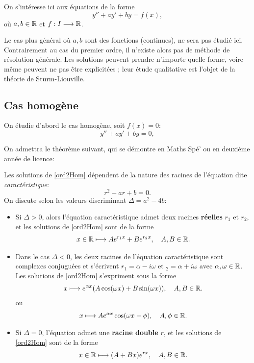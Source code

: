 \documentclass[../main.tex]{subfiles}
\begin{document}
On s'intéresse ici aux équations de la forme
	\begin{equation}\label{ord2Lin}
		y'' + ay' + by = f(x),\tag{E}
	\end{equation}
où $a,b\in\mathbb R$ et $f:I\longrightarrow\mathbb R$.

Le cas plus général où $a,b$ sont des fonctions (continues), ne sera pas étudié ici. Contrairement au cas du premier ordre, il n'existe alors pas de méthode de résolution générale. Les solutions peuvent prendre n'importe quelle forme, voire même peuvent ne pas être explicitées ; leur étude qualitative est l'objet de la théorie de Sturm-Liouville.

\subsection{Cas homogène}

On étudie d'abord le cas homogène, soit $f(x)=0$:
\begin{equation}\label{ord2Hom}
y'' + ay' + by = 0,\tag{H}
\end{equation}

On admettra le théorème suivant, qui se démontre en Maths Spé' ou en deuxième année de licence:
\begin{thm}
	Les solutions de \eqref{ord2Hom} dépendent de la nature des racines de l'équation dite \textit{caractéristique}:
	\[
	r^2 + ar + b = 0.
	\]
	On discute selon les valeurs discriminant $\Delta=a^2 - 4b$:\begin{itemize}
		\item Si $\Delta> 0$, alors l'équation caractéristique admet deux racines \textbf{réelles} $r_1$ et $r_2$, et les solutions de \eqref{ord2Hom} sont de la forme
			\[
			x\in\mathbb R\longmapsto Ae^{r_1x} + Be^{r_2x},\quad A,B\in\mathbb R.
			\]
		\item Dans le cas $\Delta<0$, les deux racines de l'équation caractéristique sont complexes conjuguées et s'écrivent $r_1=\alpha- i\omega$ et $_2=\alpha+i\omega$ avec $\alpha,\omega\in\mathbb R$. Les solutions de \eqref{ord2Hom} s'expriment sous la forme
			\[
			x\longmapsto e^{\alpha x}(A\cos(\omega x)+B\sin(\omega x)),\quad A,B\in\mathbb R.
			\]
		ou
			\[
			x\longmapsto Ae^{\alpha x}\cos(\omega x-\phi),\quad A,\phi\in\mathbb R.
			\]
		\item Si $\Delta=0$, l'équation admet une \textbf{racine double} $r$, et les solutions de \eqref{ord2Hom} sont de la forme
			\[
			x\in\mathbb R\longmapsto (A+Bx)e^{rx},\quad A,B\in\mathbb R.
			\]
	\end{itemize}
\end{thm}
\end{document}
